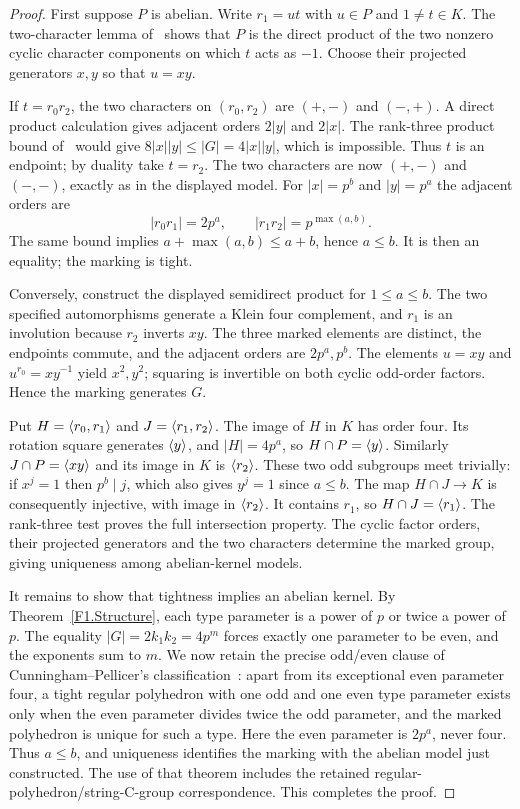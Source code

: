 \begin{proof}
First suppose $P$ is abelian. Write $r_1=ut$ with $u\in P$ and
$1\ne t\in K$. The two-character lemma of~\cite{UF} shows that
$P$ is the direct product of the two nonzero cyclic character
components on which $t$ acts as $-1$. Choose their projected
generators $x,y$ so that $u=xy$.

If $t=r_0r_2$, the two characters on $(r_0,r_2)$ are $(+,-)$ and
$(-,+)$. A direct product calculation gives adjacent orders
$2|y|$ and $2|x|$. The rank-three product bound of~\cite{UF} would
give $8|x||y|\leq |G|=4|x||y|$, which is impossible.
Thus $t$ is an endpoint; by duality take $t=r_2$. The two characters
are now $(+,-)$ and $(-,-)$, exactly as in the displayed model.
For $|x|=p^b$ and $|y|=p^a$ the adjacent orders are
\[
 |r_0r_1|=2p^a,\qquad |r_1r_2|=p^{\max(a,b)}.
\]
The same bound implies $a+\max(a,b)\leq a+b$, hence $a\leq b$.
It is then an equality; the marking is tight.

Conversely, construct the displayed semidirect product for
$1\leq a\leq b$. The two specified automorphisms generate a
Klein four complement, and $r_1$ is an involution because $r_2$
inverts $xy$. The three marked elements are distinct, the endpoints
commute, and the adjacent orders are $2p^a,p^b$.
The elements $u=xy$ and $u^{r_0}=xy^{-1}$ yield $x^2,y^2$;
squaring is invertible on both cyclic odd-order factors. Hence the
marking generates $G$.

Put $H=\langle r_0,r_1\rangle$ and $J=\langle r_1,r_2\rangle$.
The image of $H$ in $K$ has order four. Its rotation square
generates $\langle y\rangle$, and $|H|=4p^a$, so $H\cap P=\langle y\rangle$.
Similarly $J\cap P=\langle xy\rangle$ and its image in $K$ is
$\langle r_2\rangle$. These two odd subgroups meet trivially: if $x^j=1$
then $p^b\mid j$, which also gives $y^j=1$ since $a\leq b$.
The map $H\cap J\longrightarrow K$ is consequently injective,
with image in $\langle r_2\rangle$. It contains $r_1$, so
$H\cap J=\langle r_1\rangle$. The rank-three test proves the full
intersection property. The cyclic factor orders, their projected
generators and the two characters determine the marked group,
giving uniqueness among abelian-kernel models.

It remains to show that tightness implies an abelian kernel. By
Theorem~\ref{F1.Structure}, each type parameter is a power of $p$
or twice a power of $p$. The equality $|G|=2k_1k_2=4p^m$
forces exactly one parameter to be even, and the exponents sum to
$m$. We now retain the precise odd/even clause of
Cunningham--Pellicer's classification~\cite[Theorem 1.1(b),(c)]{CP}:
apart from its exceptional even parameter four, a tight regular
polyhedron with one odd and one even type parameter exists only
when the even parameter divides twice the odd parameter, and the
marked polyhedron is unique for such a type. Here the even parameter
is $2p^a$, never four. Thus $a\leq b$, and uniqueness identifies
the marking with the abelian model just constructed. The use of that
theorem includes the retained regular-polyhedron/string-C-group
correspondence. This completes the proof.
\end{proof}

